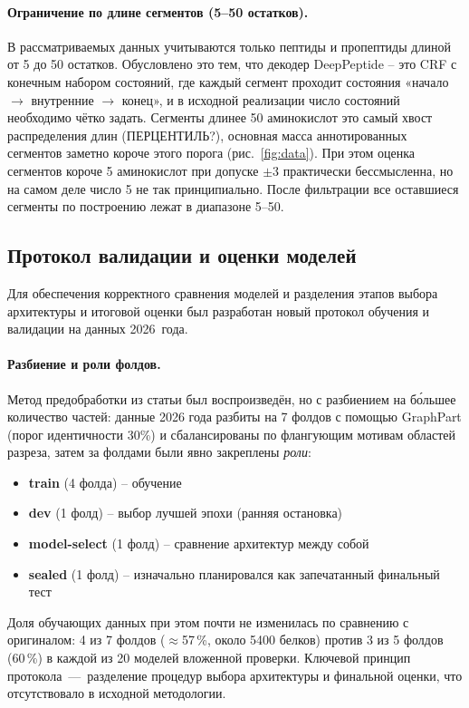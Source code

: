\documentclass{article}
\begin{document}
\paragraph{Ограничение по длине сегментов (5--50 остатков).} В рассматриваемых данных учитываются только пептиды и пропептиды длиной от 5 до 50 остатков. Обусловлено это тем, что декодер DeepPeptide -- это CRF с конечным набором состояний, где каждый сегмент проходит состояния «начало $\to$ внутренние $\to$ конец», и в исходной реализации число состояний необходимо чётко задать. Сегменты длинее 50 аминокислот это самый хвост распределения длин (ПЕРЦЕНТИЛЬ?), основная масса аннотированных сегментов заметно короче этого порога (рис.~\ref{fig:data}). При этом оценка сегментов короче 5 аминокислот при допуске $\pm3$ практически бессмысленна, но на самом деле число 5 не так принципиально. После фильтрации все оставшиеся сегменты по построению лежат в диапазоне 5--50.

\subsection{Протокол валидации и оценки моделей}\label{sec:protocol}
Для обеспечения корректного сравнения моделей и разделения этапов выбора архитектуры и итоговой оценки был разработан новый протокол обучения и валидации на данных 2026 года.

\paragraph{Разбиение и роли фолдов.} Метод предобработки из статьи был воспроизведён, но с разбиением на б\'{о}льшее количество частей: данные 2026 года разбиты на 7 фолдов с помощью GraphPart (порог идентичности 30\%) и сбалансированы по флангующим мотивам областей разреза, затем за фолдами были явно закреплены \emph{роли}:
\begin{itemize}
  \item \textbf{train} (4 фолда) -- обучение
  \item \textbf{dev} (1 фолд) -- выбор лучшей эпохи (ранняя остановка)
  \item \textbf{model-select} (1 фолд) -- сравнение архитектур между собой
  \item \textbf{sealed} (1 фолд) -- изначально планировался как запечатанный финальный тест
\end{itemize}
Доля обучающих данных при этом почти не изменилась по сравнению с оригиналом: 4 из 7 фолдов ($\approx$57\,\%, около 5400 белков) против 3 из 5 фолдов (60\,\%) в каждой из 20 моделей вложенной проверки. Ключевой принцип протокола — разделение процедур выбора архитектуры и финальной оценки, что отсутствовало в исходной методологии.
\end{document}
